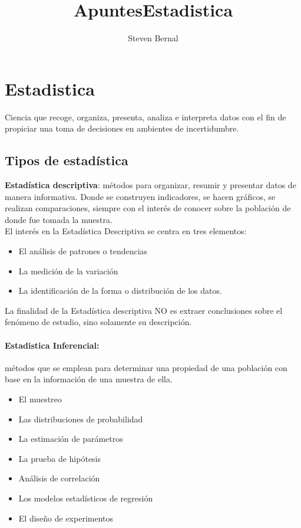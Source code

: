 \documentclass{article}
\title{ApuntesEstadistica}
\author{Steven Bernal }
\begin{document}
\maketitle

\section{Estadistica}
Ciencia que recoge, organiza, presenta, analiza e interpreta datos con el fin de propiciar una toma de decisiones en ambientes de incertidumbre.

\subsection{Tipos de estadística}

\textbf{Estadística descriptiva}:
métodos para organizar, resumir y presentar datos de manera informativa. Donde se construyen indicadores, se hacen gráﬁcos, se realizan comparaciones, siempre con el interés de conocer sobre la población de donde fue tomada la muestra.\\

El interés en la Estadística Descriptiva se centra en tres elementos:

\begin{itemize}
	
    \item El análisis de patrones o tendencias
    \item La medición de la variación
    \item La identiﬁcación de la forma o distribución de los datos.
    
\end{itemize}
		La ﬁnalidad de la Estadística descriptiva NO es extraer conclusiones sobre el fenómeno de estudio, sino solamente su descripción.
	
\paragraph{Estadistica Inferencial:}
	métodos que se emplean para determinar una propiedad de una población con base en la información de una muestra de ella.
	
\begin{itemize}
    \item El muestreo
    \item Las distribuciones de probabilidad
    \item La estimación de parámetros
    \item La prueba de hipótesis
    \item Análisis de correlación
    \item  Los modelos estadísticos de regresión
    \item El diseño de experimentos
\end{itemize}
\end{document}
